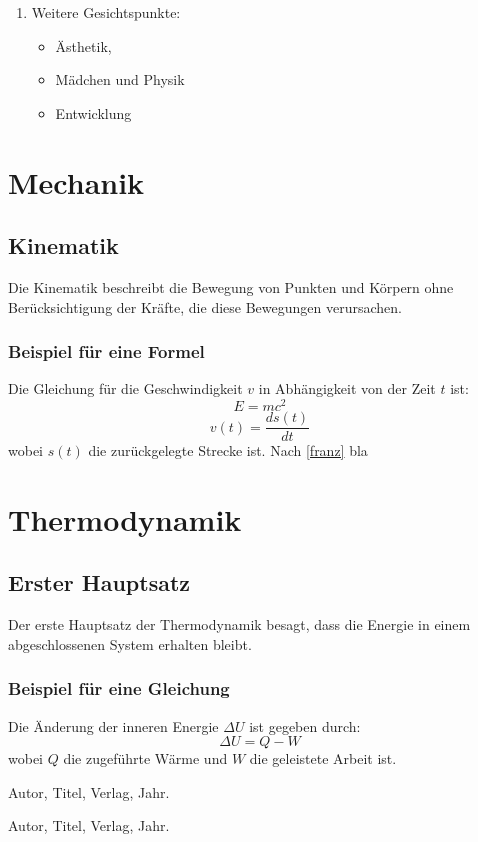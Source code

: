 \documentclass[11pt,a4paper]{book}
\begin{document}
\begin{enumerate}
\begin{itemize}
\end{itemize}

\item Weitere Gesichtspunkte:
\begin{itemize}
\item \"{A}sthetik,
\item M\"{a}dchen und Physik
\item Entwicklung
\end{itemize}

\end{enumerate}


\section{Mechanik}
\subsection{Kinematik}
Die Kinematik beschreibt die Bewegung von Punkten und Körpern ohne Berücksichtigung der Kräfte, die diese Bewegungen verursachen.

\subsubsection{Beispiel für eine Formel}
Die Gleichung für die Geschwindigkeit \(v\) in Abhängigkeit von der Zeit \(t\) ist:
\begin{equation}
	E=mc^2
\end{equation}
\begin{equation}
    v(t) = \frac{ds(t)}{dt} \label{franz}
\end{equation}
wobei \(s(t)\) die zurückgelegte Strecke ist. Nach \cref{franz} bla

\section{Thermodynamik}
\subsection{Erster Hauptsatz}
Der erste Hauptsatz der Thermodynamik besagt, dass die Energie in einem abgeschlossenen System erhalten bleibt.

\subsubsection{Beispiel für eine Gleichung}
Die Änderung der inneren Energie \( \Delta U \) ist gegeben durch:
\begin{equation}
    \Delta U = Q - W
\end{equation}
wobei \( Q \) die zugeführte Wärme und \( W \) die geleistete Arbeit ist.


\newpage
\begin{thebibliography}{9}
Autor, Titel, Verlag, Jahr.

Autor, Titel, Verlag, Jahr.
\end{thebibliography}
\end{document}
